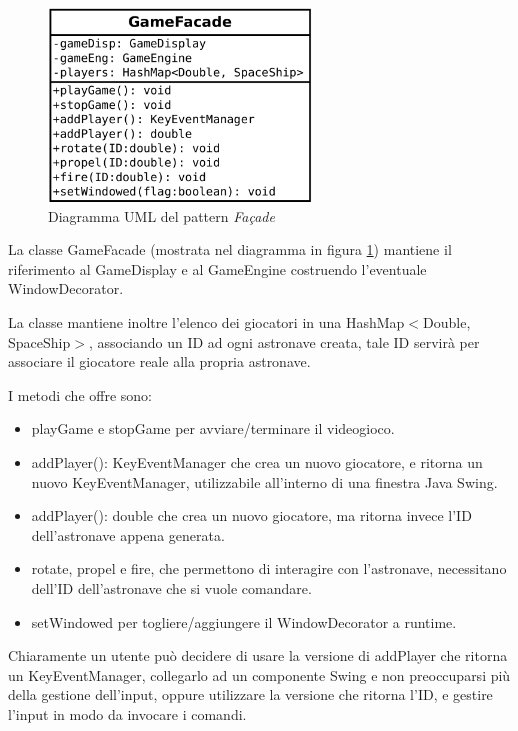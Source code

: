 \documentclass[a4paper,12pt]{article}
\begin{document}
\begin{figure}[h]
\centering
\includegraphics[width=7cm]{Facade.pdf}
\caption{Diagramma UML del pattern \emph{Façade}}
\label{img:Facade}
\end{figure}

La classe \textsf{GameFacade} (mostrata nel diagramma in figura \ref{img:Facade}) mantiene il riferimento al \textsf{GameDisplay} e al \textsf{GameEngine} costruendo l'eventuale \textsf{WindowDecorator}.

La classe mantiene inoltre l'elenco dei giocatori in una \textsf{HashMap}$<$\textsf{Double}, \textsf{SpaceShip}$>$, associando un ID ad ogni astronave creata, tale ID servir\`a per associare il giocatore reale alla propria astronave.

I metodi che offre sono:
\begin{itemize}
\item \textsf{playGame} e \textsf{stopGame} per avviare/terminare il videogioco.
\item \textsf{addPlayer(): KeyEventManager} che crea un nuovo giocatore, e ritorna un nuovo \textsf{KeyEventManager}, utilizzabile all'interno di una finestra Java Swing.
\item \textsf{addPlayer(): double} che crea un nuovo giocatore, ma ritorna invece l'ID dell'astronave appena generata.
\item \textsf{rotate}, \textsf{propel} e \textsf{fire}, che permettono di interagire con l'astronave, necessitano dell'ID dell'astronave che si vuole comandare.
\item \textsf{setWindowed} per togliere/aggiungere il \textsf{WindowDecorator} a runtime.
\end{itemize}

Chiaramente un utente pu\`o decidere di usare la versione di \textsf{addPlayer} che ritorna un \textsf{KeyEventManager}, collegarlo ad un componente Swing e non preoccuparsi pi\`u della gestione dell'input, oppure utilizzare la versione che ritorna l'ID, e gestire l'input in modo da invocare i comandi.
\end{document}
